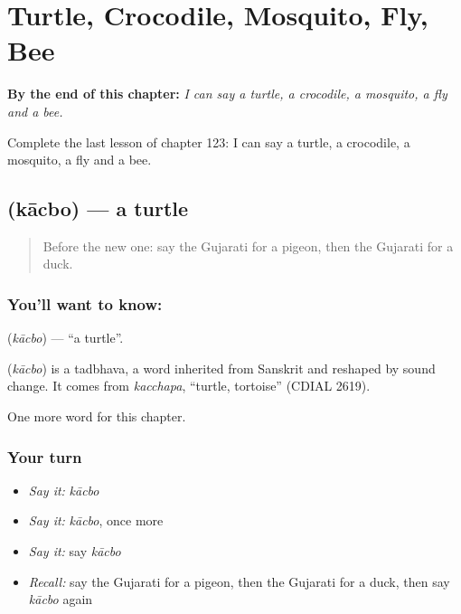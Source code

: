 
\chapter{Turtle, Crocodile, Mosquito, Fly, Bee}
\label{ch:gu-turtle-crocodile-mosquito-fly-bee}

\begin{chapteropening}
\textbf{By the end of this chapter:} \emph{I can say a turtle, a crocodile, a mosquito, a fly and a bee.}

Complete the last lesson of chapter 123: I can say a turtle, a crocodile, a mosquito, a fly and a bee.
\end{chapteropening}

\section[\texorpdfstring{\gu{કાચબો} (kācbo)}{કાચબો (kācbo)}]{ (kācbo) — a turtle}

\label{lesson:GU-C123-kacbo}



\begin{quote}
Before the new one: say the Gujarati for a pigeon, then the Gujarati for a duck.
\end{quote}

\subsection*{You'll want to know: }
\textbf{} (\emph{kācbo}) — \textquotedblleft{}a turtle\textquotedblright{}.

\begin{cousinweb}
\textbf{} (\emph{kācbo}) is a tadbhava, a word inherited from Sanskrit and reshaped by sound change. It comes from \emph{kacchapa}, \textquotedblleft{}turtle, tortoise\textquotedblright{} (CDIAL 2619).
\end{cousinweb}

\begin{grammarlens}[title={What you've built}]
One more word for this chapter.
\end{grammarlens}

\subsection*{Your turn}
\begin{itemize}
\raggedright
  \item \emph{Say it:} \emph{kācbo}
  \item \emph{Say it:} \emph{kācbo}, once more
  \item \emph{Say it:} say \emph{kācbo}
  \item \emph{Recall:} say the Gujarati for a pigeon, then the Gujarati for a duck, then say \emph{kācbo} again
\end{itemize}

